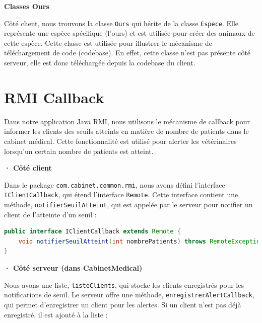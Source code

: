 \documentclass{article} %
\begin{document}
\textbf{Classes Ours}
\bigskip

Côté client, nous trouvons la classe \texttt{Ours} qui hérite de la classe \texttt{Espece}. 
Elle représente une espèce spécifique (l'ours) et est utilisée pour créer des animaux de cette espèce.
Cette classe est utilisée pour illustrer le mécanisme de téléchargement de code (codebase).
En effet, cette classe n'est pas présente côté serveur, elle est donc téléchargée depuis la codebase du client.


\section{RMI Callback}\label{sec:callback}

Dans notre application Java RMI, nous utilisons le mécanisme de callback pour informer les 
clients des seuils atteints en matière de nombre de patients dans le cabinet médical. 
Cette fonctionnalité est utilisé pour alerter les vétérinaires lorsqu'un certain nombre de patients est atteint.

\bigskip
\textbf{· Côté client}
\bigskip


Dans le package \texttt{com.cabinet.common.rmi}, nous avons défini l'interface \texttt{IClientCallback}, 
qui étend l'interface \texttt{Remote}. Cette interface contient une méthode, \texttt{notifierSeuilAtteint}, 
qui est appelée par le serveur pour notifier un client de l'atteinte d'un seuil : 

\begin{lstlisting}[language=Java]
public interface IClientCallback extends Remote {
    void notifierSeuilAtteint(int nombrePatients) throws RemoteException;
}

\end{lstlisting}

\bigskip
\textbf{· Côté serveur (dans CabinetMedical)}
\bigskip

Nous avons une liste, \texttt{listeClients}, qui stocke les clients enregistrés pour les notifications de seuil. 
Le serveur offre une méthode, \texttt{enregistrerAlertCallback}, qui permet d'enregistrer un client pour les alertes. 
Si un client n'est pas déjà enregistré, il est ajouté à la liste :
\end{document}
